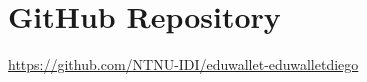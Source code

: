 \chapter{GitHub Repository}
\label{chap:gitHub}

\url{https://github.com/NTNU-IDI/eduwallet-eduwalletdiego}